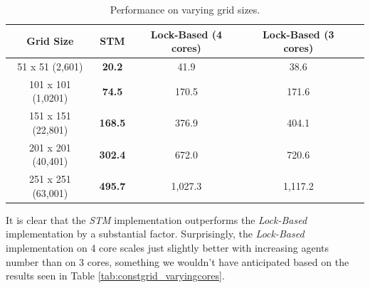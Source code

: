 \begin{table}
	\centering
  	\begin{tabular}{ c || c | c | c | c }
        Grid Size          & STM              & Lock-Based (4 cores) & Lock-Based (3 cores) \\ \hline \hline 
   		51 x 51 (2,601)    & \textbf{20.2}    & 41.9                 & 38.6                 \\ \hline
   		101 x 101 (1,0201) & \textbf{74.5}    & 170.5                & 171.6                \\ \hline
   		151 x 151 (22,801) & \textbf{168.5}   & 376.9                & 404.1                \\ \hline
   		201 x 201 (40,401) & \textbf{302.4}   & 672.0                & 720.6                \\ \hline
   		251 x 251 (63,001) & \textbf{495.7}   & 1,027.3              & 1,117.2              \\ \hline \hline
  	\end{tabular}

  	\caption{Performance on varying grid sizes.}
	\label{tab:varyinggrid_constcores}
\end{table}

It is clear that the \textit{STM} implementation outperforms the \textit{Lock-Based} implementation by a substantial factor. Surprisingly, the \textit{Lock-Based} implementation on 4 core scales just slightly better with increasing agents number than on 3 cores, something we wouldn't have anticipated based on the results seen in Table \ref{tab:constgrid_varyingcores}. %

